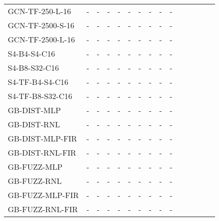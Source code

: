 \begin{table*}[h]
\begin{tabular}{lcccccccccccccc}
        GCN-TF-250-L-16               
            & - & - & - & - & - & - & - & - & - \\
        GCN-TF-2500-S-16               
            & - & - & - & - & - & - & - & - & - \\
        GCN-TF-2500-L-16               
            & - & - & - & - & - & - & - & - & - \\
        \midrule
        S4-B4-S4-C16              
            & - & - & - & - & - & - & - & - & - \\
        S4-B8-S32-C16               
            & - & - & - & - & - & - & - & - & - \\
        \midrule
        S4-TF-B4-S4-C16              
            & - & - & - & - & - & - & - & - & - \\
        S4-TF-B8-S32-C16               
            & - & - & - & - & - & - & - & - & - \\
        \midrule
        GB-DIST-MLP             
            & - & - & - & - & - & - & - & - & - \\
        GB-DIST-RNL             
            & - & - & - & - & - & - & - & - & - \\
        \midrule
        GB-DIST-MLP-FIR
            & - & - & - & - & - & - & - & - & - \\
        GB-DIST-RNL-FIR         
            & - & - & - & - & - & - & - & - & - \\
        \midrule
        GB-FUZZ-MLP             
            & - & - & - & - & - & - & - & - & - \\
        GB-FUZZ-RNL             
            & - & - & - & - & - & - & - & - & - \\
        \midrule
        GB-FUZZ-MLP-FIR
            & - & - & - & - & - & - & - & - & - \\
        GB-FUZZ-RNL-FIR         
            & - & - & - & - & - & - & - & - & - \\
        \bottomrule 
    \end{tabular}
    \label{tab:other_fx}
\end{table*}

